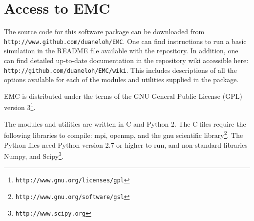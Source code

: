 \documentclass[]{iucr}              %
\begin{document}
     
\section{Access to EMC} \label{sec:access}

The source code for this software package can be downloaded from \texttt{http://www.github.com/duaneloh/EMC}. One can find instructions to run a basic simulation in the README file available with the repository. In addition, one can find detailed up-to-date documentation in the repository wiki accessible here: \texttt{http://github.com/duaneloh/EMC/wiki}. This includes descriptions of all the options available for each of the modules and utilities supplied in the package.

EMC is distributed under the terms of the GNU General Public License (GPL) version 3\footnote{\texttt{http://www.gnu.org/licenses/gpl}}.

The modules and utilities are written in C and Python 2. The C files require the following libraries to compile: mpi, openmp, and the gnu scientific library\footnote{\texttt{http://www.gnu.org/software/gsl}}. The Python files need Python version 2.7 or higher to run, and non-standard libraries Numpy, and Scipy\footnote{\texttt{http://www.scipy.org}}.


\appendix
\end{document}
